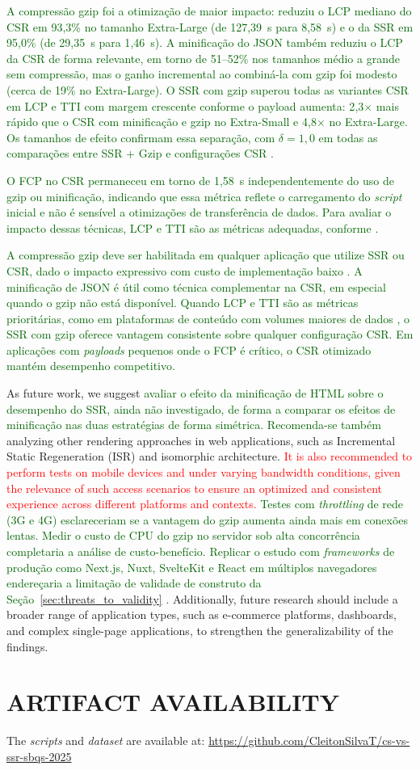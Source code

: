 \documentclass{sbc2019}%
\newcommand{\todo}[1]{\textcolor{red}{#1}}
\begin{document}
\textcolor{darkgreen}{A compressão gzip foi a otimização de maior impacto: reduziu o LCP mediano do CSR em 93{,}3\% no tamanho Extra-Large (de 127{,}39~s para 8{,}58~s) e o da SSR em 95{,}0\% (de 29{,}35~s para 1{,}46~s). A minificação do JSON também reduziu o LCP da CSR de forma relevante, em torno de 51--52\% nos tamanhos médio a grande sem compressão, mas o ganho incremental ao combiná-la com gzip foi modesto (cerca de 19\% no Extra-Large). O SSR com gzip superou todas as variantes CSR em LCP e TTI com margem crescente conforme o payload aumenta: 2{,}3$\times$ mais rápido que o CSR com minificação e gzip no Extra-Small e 4{,}8$\times$ no Extra-Large. Os tamanhos de efeito confirmam essa separação, com $\delta = 1{,}0$ em todas as comparações entre SSR + Gzip e configurações CSR \cite{Cliff1993,Romano2006}.}

\textcolor{darkgreen}{O FCP no CSR permaneceu em torno de 1{,}58~s independentemente do uso de gzip ou minificação, indicando que essa métrica reflete o carregamento do \textit{script} inicial e não é sensível a otimizações de transferência de dados. Para avaliar o impacto dessas técnicas, LCP e TTI são as métricas adequadas, conforme \citet{verma:2024}.}

\textcolor{darkgreen}{A compressão gzip deve ser habilitada em qualquer aplicação que utilize SSR ou CSR, dado o impacto expressivo com custo de implementação baixo \cite{sikder:2016}. A minificação de JSON é útil como técnica complementar na CSR, em especial quando o gzip não está disponível. Quando LCP e TTI são as métricas prioritárias, como em plataformas de conteúdo com volumes maiores de dados \cite{gangishetti:2026}, o SSR com gzip oferece vantagem consistente sobre qualquer configuração CSR. Em aplicações com \textit{payloads} pequenos onde o FCP é crítico, o CSR otimizado mantém desempenho competitivo.}

As future work, we suggest \textcolor{darkgreen}{avaliar o efeito da minificação de HTML sobre o desempenho do SSR, ainda não investigado, de forma a comparar os efeitos de minificação nas duas estratégias de forma simétrica. Recomenda-se também} analyzing other rendering approaches in web applications, such as Incremental Static Regeneration (ISR) and isomorphic architecture. \todo{It is also recommended to perform tests on mobile devices and under varying bandwidth conditions, given the relevance of such access scenarios to ensure an optimized and consistent experience across different platforms and contexts.} \textcolor{darkgreen}{Testes com \textit{throttling} de rede (3G e 4G) esclareceriam se a vantagem do gzip aumenta ainda mais em conexões lentas. Medir o custo de CPU do gzip no servidor sob alta concorrência completaria a análise de custo-benefício. Replicar o estudo com \textit{frameworks} de produção como Next.js, Nuxt, SvelteKit e React em múltiplos navegadores endereçaria a limitação de validade de construto da Seção~\ref{sec:threats_to_validity} \cite{ollila:2021}.} Additionally, future research should include a broader range of application types, such as e-commerce platforms, dashboards, and complex single-page applications, to strengthen the generalizability of the findings.


\section*{ARTIFACT AVAILABILITY}
The \textit{scripts} and \textit{dataset} are available at:
\url{https://github.com/CleitonSilvaT/cs-vs-ssr-sbqs-2025}



\end{document}
